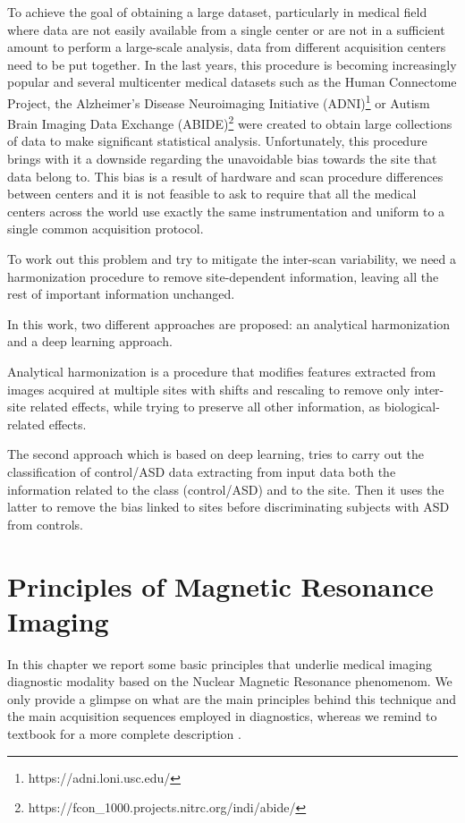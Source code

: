 \documentclass[11pt]{report}
\begin{document}
To achieve the goal of obtaining a large dataset, particularly in medical field where data are not easily available from a single center or are not in a sufficient amount to perform a large-scale analysis, data from different acquisition centers need to be put together.
In the last years, this procedure is becoming increasingly popular and several multicenter medical datasets such as the Human Connectome Project, the Alzheimer’s Disease Neuroimaging Initiative (ADNI)\footnote{https://adni.loni.usc.edu/} or Autism Brain Imaging Data Exchange (ABIDE)\footnote{https://fcon\_1000.projects.nitrc.org/indi/abide/} were created to obtain large collections of data to make significant statistical analysis.
Unfortunately, this procedure brings with it a downside regarding the unavoidable bias towards the site that data belong to.
This bias is a result of hardware and scan procedure differences between centers and it is not feasible to ask to require that all the medical centers across the world use exactly the same instrumentation and uniform to a single common acquisition protocol.

To work out this problem and try to mitigate the inter-scan variability, we need a harmonization procedure to remove site-dependent information, leaving all the rest of important information unchanged.

In this work, two different approaches are proposed: an analytical harmonization and a deep learning approach.

Analytical harmonization is a procedure that modifies features extracted from images acquired at multiple sites with shifts and rescaling to remove only inter-site related effects, while trying to preserve all other information, as biological-related effects.

The second approach which is based on deep learning, tries to carry out the classification of control/ASD data extracting from input data both the information related to the class (control/ASD) and to the site.
Then it uses the latter to remove the bias linked to sites before discriminating subjects with ASD from controls.


\chapter{Principles of Magnetic Resonance Imaging}\label{chap:mri_introduction}
 In this chapter we report some basic principles that underlie medical imaging diagnostic modality based on the Nuclear Magnetic Resonance phenomenom.
We only provide a glimpse on what are the main principles behind this technique and the main acquisition sequences employed in diagnostics, whereas we remind to textbook for a more complete description \cite{brown-2014}.
\end{document}
